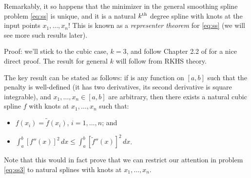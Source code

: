 \documentclass{article}
\begin{document}
\def\tf{\tilde{f}}

Remarkably, it so happens that the minimizer in the general smoothing spline
problem \eqref{eq:ss} is unique, and it is a natural $k^{\text{th}}$ degree spline with 
knots at the input points $x_1,\dots,x_n$! This is known as a \emph{representer
  theorem} for \eqref{eq:ss} (we will see more such results later). 

Proof: we'll stick to the cubic case, $k=3$, and follow Chapter 2.2 of
\citet{green1993nonparametric} for a nice direct proof. The result for general
$k$ will follow from RKHS theory.  

The key result can be stated as follows: if \smash{$\tf$} is any function on 
$[a,b]$ such that the penalty is well-defined (it has two derivatives, its
second derivative is square integrable), and $x_1,\dots,x_n \in [a,b]$ are
arbitrary, then there exists a natural cubic spline $f$ with knots at
$x_1,\dots,x_n$ such that:
\begin{itemize}
\item $f(x_i) = \tf(x_i)$, $i=1,\dots,n$; and 
\item $\int_a^b [f''(x)]^2 \, dx \leq \int_a^b [\tf''(x)]^2 \, dx$.
\end{itemize}
Note that this would in fact prove that we can restrict our attention in problem 
\eqref{eq:ss3} to natural splines with knots at $x_1,\dots,x_n$.
\end{document}
